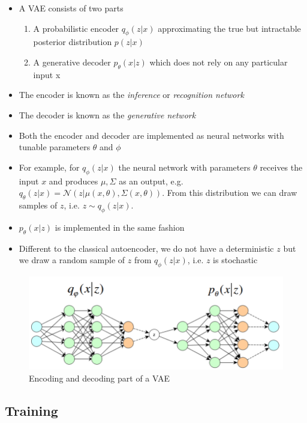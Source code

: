 \documentclass[]{article}
\begin{document}
\begin{itemize}
    \item A VAE consists of two parts
        \begin{enumerate}
        \item A probabilistic encoder $q_{\phi}(z|x)$ approximating the true but intractable posterior distribution $p(z|x)$
    \item A generative decoder $p_{\theta}(x|z)$ which does not rely on any particular input x
        \end{enumerate}
    \item The encoder is known as the \textit{inference} or \textit{recognition network}
        \item The decoder is known as the \textit{generative network}  
    \item Both the encoder and decoder are implemented as neural networks with tunable parameters $\theta$ and $\phi$
    \item For example, for $q_{\phi}(z|x)$ the neural network with parameters $\theta$ receives the input $x$ and produces $\mu, \Sigma$ as an output, e.g. $q_{\theta}(z|x) = \mathcal{N}(z| \mu(x, \theta),\Sigma(x, \theta))$. From this distribution we can draw samples of $z$, i.e. $z \sim q_{\phi}(z|x)$. 
    \item $p_{\theta}(x|z)$ is implemented in the same fashion
                \item Different to the classical autoencoder, we do not have a deterministic $z$ but we draw a random sample of $z$ from $q_{\phi}(z|x)$, i.e. $z$ is stochastic 
\end{itemize}

\begin{figure}[h!]
    \centering
    \includegraphics[width=0.8\linewidth]{VAE_parts}
    \caption{Encoding and decoding part of a VAE}
    \label{fig:vae}
\end{figure}


\subsection{Training}
\label{sec:vae_training}
\end{document}
